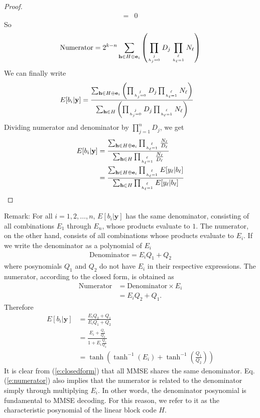 \documentclass[conference]{IEEEtran}
\newcommand{\vect}[1]{\mathbf{#1}}
\begin{document}
\begin{proof}
\begin{align}
=&0
\end{align}
So
\begin{align}
\text{Numerator}=2^{k-n}\sum_{\vect{h}\in H\oplus\vect{e}_i}\left(\prod_{j\atop h_j = 0}D_j\prod_{\ell\atop h_\ell = 1} N_\ell\right)
\end{align}
We can finally write
\begin{align}
E[b_i|\vect{y}] &= \frac{\sum_{\vect{h}\in H\oplus\vect{e}_i}\left(\prod_{j\atop h_j = 0}D_j\prod_{\ell\atop h_\ell = 1} N_\ell\right)}{\sum_{\vect{h}\in H}\left(\prod_{j\atop h_j = 0}D_j\prod_{\ell\atop h_\ell = 1} N_\ell\right)}
\end{align}
Dividing numerator and denominator by $\prod_{j=1}^nD_j$, we get
\begin{align}
E[b_i|\vect{y}] &=\frac{\sum_{\vect{h}\in H\oplus\vect{e}_i}\prod_{\ell\atop h_\ell = 1} \frac{N_\ell}{D_\ell}}{\sum_{\vect{h}\in H}\prod_{\ell\atop h_\ell = 1} \frac{N_\ell}{D_\ell}}\\
&=\frac{\sum_{\vect{h}\in H\oplus\vect{e}_i}\prod_{\ell\atop h_\ell = 1} E[y_\ell|b_\ell]}{\sum_{\vect{h}\in H}\prod_{\ell\atop h_\ell = 1} E[y_\ell|b_\ell]}
\end{align}
\end{proof}
Remark: For all $i=1,2,\ldots,n$, $E[b_i|\vect{y}]$ has the same denominator, consisting of all combinations $E_1$ through $E_n$, whose products evaluate to $1$. The numerator, on the other hand, consists of all combinations whose products evaluate to $E_i$. If we write the denominator as a polynomial of $E_i$
\begin{align*}
\mathrm{Denominator}=E_iQ_1+Q_2
\end{align*}
where posynomials $Q_1$ and $Q_2$ do not have $E_i$ in their respective expressions. The numerator, according to the closed form, is obtained as
\begin{align}
\mathrm{Numerator} &= \mathrm{Denominator} \times E_i\label{e:numerator}\\
&=E_iQ_2 + Q_1.
\end{align}
Therefore
\begin{align*}
E[b_i|\vect{y}] &= \frac{E_iQ_2+Q_1}{E_iQ_1+Q_2}\\
&=\frac{E_i+\frac{Q_1}{Q_2}}{1+E_i\frac{Q_1}{Q_2}}\\
&=\tanh\left(\tanh^{-1}(E_i)+\tanh^{-1}\left(\frac{Q_1}{Q_2}\right)\right)
\end{align*}
It is clear from (\ref{e:closedform}) that all MMSE shares the same denominator. Eq. (\ref{e:numerator}) also implies that the numerator is related to the denominator simply through multiplying $E_i$. In other words, the denominator posynomial is fundamental to MMSE decoding. For this reason, we refer to it as the characteristic posynomial of the linear block code $H$.
\end{document}
